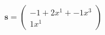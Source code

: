 \documentclass[preview]{standalone}
\begin{document}
\begin{align*}
\mathbf{s} = \begin{pmatrix}-1 + 2x^{1} + -1x^{3} \\ 1x^{1}\end{pmatrix}
\end{align*}
\end{document}
